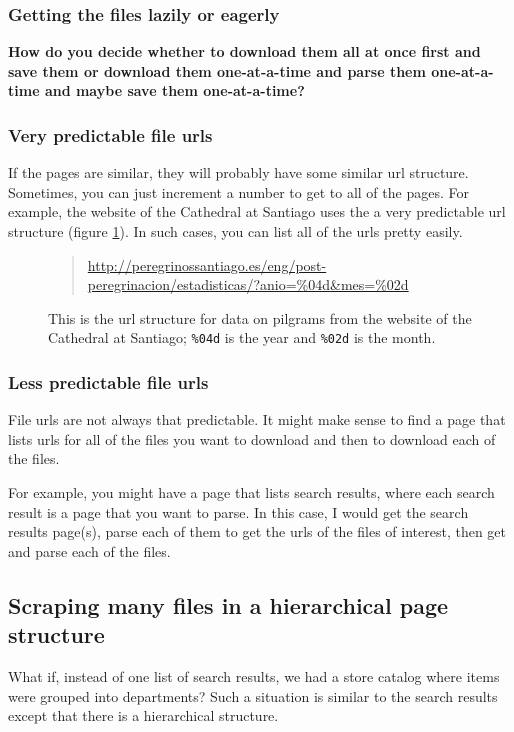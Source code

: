\documentclass{article}
\newcommand\todo[1]{\textbf{#1}}
\begin{document}
\subsubsection{Getting the files lazily or eagerly}
\todo{How do you decide whether to download them all at once first and save them or download them one-at-a-time and parse them one-at-a-time and maybe save them one-at-a-time?}

\subsubsection{Very predictable file urls}
If the pages are similar, they will probably have some similar url structure.
Sometimes, you can just increment a number to get to all of the pages.
For example, the website of the Cathedral at Santiago uses the a very predictable
url structure (figure \ref{fig:santiago_urls}).
In such cases, you can list all of the urls pretty easily.

\begin{figure}
\begin{quote}
\url{http://peregrinossantiago.es/eng/post-peregrinacion/estadisticas/?anio=\%04d\&mes=\%02d}
\end{quote}
\caption{\label{fig:santiago_urls} This is the url structure for
data on pilgrams from the website of the Cathedral at Santiago;
\texttt{\%04d} is the year and \texttt{\%02d} is the month.}
\end{figure}

\subsubsection{Less predictable file urls}
File urls are not always that predictable. It might make sense to find a page
that lists urls for all of the files you want to download and then to download
each of the files.

For example, you might have a page that lists search results,
where each search result is a page that you want to parse.
In this case, I would get the search results page(s), parse each
of them to get the urls of the files of interest, then get and
parse each of the files.

\subsection{Scraping many files in a hierarchical page structure}
What if, instead of one list of search results, we had a store catalog
where items were grouped into departments? Such a situation is similar
to the search results except that there is a hierarchical structure.
\end{document}
